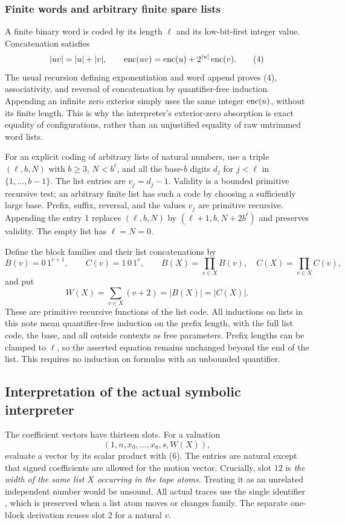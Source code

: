 \subsubsection{Finite words and arbitrary finite spare lists}

A finite binary word is coded by its length $\ell$ and its low-bit-first
integer value.  Concatenation satisfies
\[
 |uv|=|u|+|v|,\qquad
 \operatorname{enc}(uv)=\operatorname{enc}(u)+2^{|u|}\operatorname{enc}(v).                                 \tag{4}
\]
The usual recursion defining exponentiation and word append proves (4),
associativity, and reversal of concatenation by quantifier-free induction.
Appending an infinite zero exterior simply uses the same integer
$\operatorname{enc}(u)$, without its finite length.  This is why the interpreter's
exterior-zero absorption is exact equality of configurations, rather than
an unjustified equality of raw untrimmed word lists.

For an explicit coding of arbitrary lists of natural numbers, use a triple
$(\ell,b,N)$ with $b\geq3$, $N<b^\ell$, and all the base-$b$ digits
$d_j$ for $j<\ell$ in $\{1,\ldots,b-1\}$.  The list entries are
$v_j=d_j-1$.  Validity is a bounded primitive recursive test; an arbitrary
finite list has such a code by choosing a sufficiently large base.  Prefix,
suffix, reversal, and the values $v_j$ are primitive recursive.  Appending
the entry 1 replaces $(\ell,b,N)$ by
$(\ell+1,b,N+2b^\ell)$ and preserves validity.  The empty list has
$\ell=N=0$.

Define the block families and their list concatenations by
\[
 B(v)=0\,1^{v+1},\qquad C(v)=1\,0\,1^v,\qquad
 B(X)=\prod_{v\in X}B(v),\quad C(X)=\prod_{v\in X}C(v),
\]
and put
\[
 W(X)=\sum_{v\in X}(v+2)=|B(X)|=|C(X)|.                          \tag{5}
\]
These are primitive recursive functions of the list code.  All inductions
on lists in this note mean quantifier-free induction on the prefix length,
with the full list code, the base, and all outside contexts as free
parameters.  Prefix lengths can be clamped to $\ell$, so the asserted
equation remains unchanged beyond the end of the list.  This requires no
induction on formulas with an unbounded quantifier.

\subsection{Interpretation of the actual symbolic interpreter}

The coefficient vectors have thirteen slots.  For a valuation
\[
 (1,n,x_0,\ldots,x_8,s,W(X)),                                    \tag{6}
\]
evaluate a vector by its scalar product with (6).  The entries are natural
except that signed coefficients are allowed for the motion vector.
Crucially, slot 12 is \emph{the width of the same list $X$ occurring in the
tape atoms}.  Treating it as an unrelated independent number would be
unsound.  All actual traces use the single identifier
, which is preserved when a list atom moves or changes
family.  The separate one-block derivation reuses slot 2 for a natural $v$.

